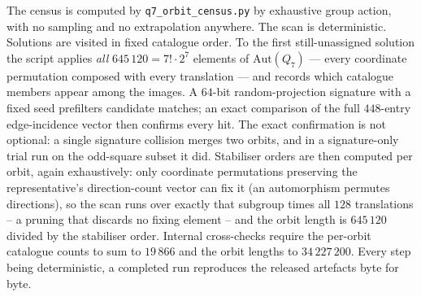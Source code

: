 \documentclass[12pt,a4paper]{article}
\theoremstyle{definition}
\begin{document}
The census is computed by \texttt{q7\_orbit\_census.py} by exhaustive
group action, with no sampling and no extrapolation anywhere. The scan is
deterministic. Solutions are visited in fixed catalogue order. To the
first still-unassigned solution the script applies \emph{all}
$645\,120=7!\cdot2^{7}$ elements of $\mathrm{Aut}(Q_7)$ --- every
coordinate permutation composed with every translation --- and records
which catalogue members appear among the images. A $64$-bit
random-projection signature with a fixed seed prefilters candidate
matches; an exact comparison of the full $448$-entry edge-incidence
vector then confirms every hit. The exact
confirmation is not optional: a single signature collision merges two
orbits, and in a signature-only trial run on the odd-square subset it did.
Stabiliser orders are then computed per orbit, again exhaustively: only
coordinate permutations preserving the representative's direction-count
vector can fix it (an automorphism permutes directions), so the scan runs
over exactly that subgroup times all $128$ translations -- a pruning that
discards no fixing element -- and the orbit length is $645\,120$ divided
by the stabiliser order. Internal cross-checks require the per-orbit
catalogue counts to sum to $19\,866$ and the orbit lengths to
$34\,227\,200$. Every step being deterministic, a completed run
reproduces the released artefacts byte for byte.
\end{document}
